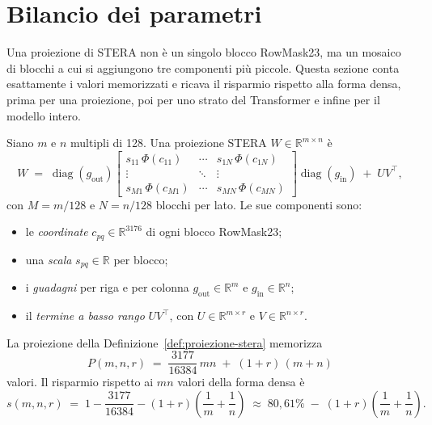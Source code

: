 
\section{Bilancio dei parametri}
\label{sec:bilancio-parametri}

Una proiezione di STERA non è un singolo blocco RowMask23, ma un mosaico di blocchi a cui si aggiungono tre componenti più piccole. Questa sezione conta esattamente i valori memorizzati e ricava il risparmio rispetto alla forma densa, prima per una proiezione, poi per uno strato del Transformer e infine per il modello intero.

\begin{definizione}
\label{def:proiezione-stera}
Siano $m$ e $n$ multipli di 128. Una proiezione STERA $W\in\mathbb{R}^{m\times n}$ è
\[
W \;=\; \operatorname{diag}(g_{\mathrm{out}})
\begin{bmatrix}
s_{11}\,\Phi(c_{11}) & \cdots & s_{1N}\,\Phi(c_{1N})\\
\vdots & \ddots & \vdots\\
s_{M1}\,\Phi(c_{M1}) & \cdots & s_{MN}\,\Phi(c_{MN})
\end{bmatrix}
\operatorname{diag}(g_{\mathrm{in}}) \;+\; U V^{\top},
\]
con $M=m/128$ e $N=n/128$ blocchi per lato. Le sue componenti sono:
\begin{itemize}
\item le \emph{coordinate} $c_{pq}\in\mathbb{R}^{3176}$ di ogni blocco RowMask23;
\item una \emph{scala} $s_{pq}\in\mathbb{R}$ per blocco;
\item i \emph{guadagni} per riga e per colonna $g_{\mathrm{out}}\in\mathbb{R}^{m}$ e $g_{\mathrm{in}}\in\mathbb{R}^{n}$;
\item il \emph{termine a basso rango} $UV^{\top}$, con $U\in\mathbb{R}^{m\times r}$ e $V\in\mathbb{R}^{n\times r}$.
\end{itemize}
\end{definizione}

\begin{proposizione}
\label{prop:risparmio-proiezione}
La proiezione della Definizione~\ref{def:proiezione-stera} memorizza
\[
P(m,n,r) \;=\; \frac{3177}{16384}\,mn \;+\; (1+r)\,(m+n)
\]
valori. Il risparmio rispetto ai $mn$ valori della forma densa è
\[
s(m,n,r) \;=\; 1-\frac{3177}{16384}-(1+r)\left(\frac1m+\frac1n\right)
\;\approx\; 80{,}61\% \;-\; (1+r)\left(\frac1m+\frac1n\right).
\]
\end{proposizione}

